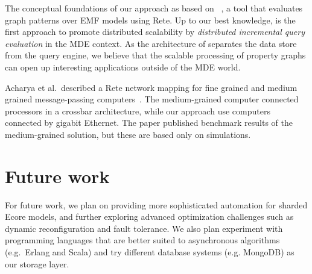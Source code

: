 The conceptual foundations of our approach as based on \eiq{}~\cite{models10}, a tool that evaluates graph patterns over EMF models using Rete. Up to our best knowledge, \iqd{} is the first approach to promote distributed scalability by \emph{distributed incremental query evaluation} in the MDE context. As the architecture of \iqd{} separates the data store from the query engine, we believe that the scalable processing of property graphs can open up interesting applications outside of the MDE world.

Acharya et al.\ described a Rete network mapping for fine grained and medium grained message-passing computers~\cite{message-passing-rete}. The medium-grained computer connected processors in a crossbar architecture, while our approach use computers connected by gigabit Ethernet. The paper published benchmark results of the medium-grained solution, but these are based only on simulations.

\section{Future work}

For future work, we plan on providing more sophisticated automation for sharded Ecore models, and further exploring advanced optimization challenges such as dynamic reconfiguration and fault tolerance.
We also plan experiment with programming languages that are better suited to asynchronous algorithms (e.g.\ Erlang and Scala) and try different database systems (e.g. MongoDB) as our storage layer.
